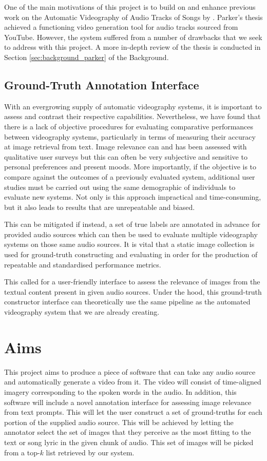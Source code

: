 \documentclass{l4proj}
\begin{document}
One of the main motivations of this project is to build on and enhance previous work on the Automatic Videography of Audio Tracks of Songs by \cite{parker}. Parker's thesis achieved a functioning video generation tool for audio tracks sourced from YouTube. However, the system suffered from a number of drawbacks that we seek to address with this project. A more in-depth review of the thesis is conducted in Section \ref{sec:background_parker} of the Background.

\subsection{Ground-Truth Annotation Interface}
With an evergrowing supply of automatic videography systems, it is important to assess and contrast their respective capabilities. Nevertheless, we have found that there is a lack of objective procedures for evaluating comparative performances between videography systems, particularly in terms of measuring their accuracy at image retrieval from text. Image relevance can and has been assessed with qualitative user surveys but this can often be very subjective and sensitive to personal preferences and present moods. More importantly, if the objective is to compare against the outcomes of a previously evaluated system, additional user studies must be carried out using the same demographic of individuals to evaluate new systems. Not only is this approach impractical and time-consuming, but it also leads to results that are unrepeatable and biased.

This can be mitigated if instead, a set of true labels are annotated in advance for provided audio sources which can then be used to evaluate multiple videography systems on those same audio sources. It is vital that a static image collection is used for ground-truth constructing and evaluating in order for the production of repeatable and standardised performance metrics.

This called for a user-friendly interface to assess the relevance of images from the textual content present in given audio sources. Under the hood, this ground-truth constructor interface can theoretically use the same pipeline as the automated videography system that we are already creating. 


\section{Aims}
This project aims to produce a piece of software that can take any audio source and automatically generate a video from it. The video will consist of time-aligned imagery corresponding to the spoken words in the audio. In addition, this software will include a novel annotation interface for assessing image relevance from text prompts. This will let the user construct a set of ground-truths for each portion of the supplied audio source. This will be achieved by letting the annotator select the set of images that they perceive as the most fitting to the text or song lyric in the given chunk of audio. This set of images will be picked from a top-$k$ list retrieved by our system.
\end{document}
